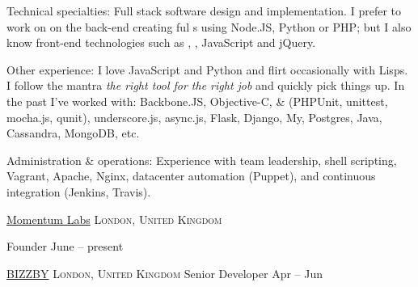 \documentclass[10pt,a4paper]{article}
\begin{document}
\inlineheadsection  %
  {Technical specialties:}
  {Full stack software design and implementation. I prefer to work on on the back-end creating ful s using Node.JS, Python or PHP; but I also know front-end technologies such as , , JavaScript and jQuery.}

\inlineheadsection  %
  {Other experience:}
  {I love JavaScript and Python and flirt occasionally with Lisps. I follow the mantra \emph{the right tool for the right job} and quickly pick things up. In the past I've worked with: Backbone.JS, Objective-C,  \&  (PHPUnit, unittest, mocha.js, qunit), underscore.js, async.js, Flask, Django, My, Postgres, Java, Cassandra, MongoDB, etc.}

\inlineheadsection  %
  {Administration \& operations:}
  {Experience with team leadership, shell scripting, Vagrant, Apache, Nginx, datacenter automation (Puppet), and continuous integration (Jenkins, Travis).}

\spacedhrule{1.5em}{-0.4em}


\headedsection  %
  {\href{http://www.momentumlabs.io}{Momentum Labs}}
  {\textsc{London, United Kingdom}} {%

  \headedsubsection  %
    {Founder}
    {June  -- present}
    {
  }
}

\headedsection
  {\href{http://www.bizzby.com}{BIZZBY}}
  {\textsc{London, United Kingdom}} {%
  \headedsubsection
    {Senior Developer}
    {Apr  -- Jun }
    {}
}
\end{document}
